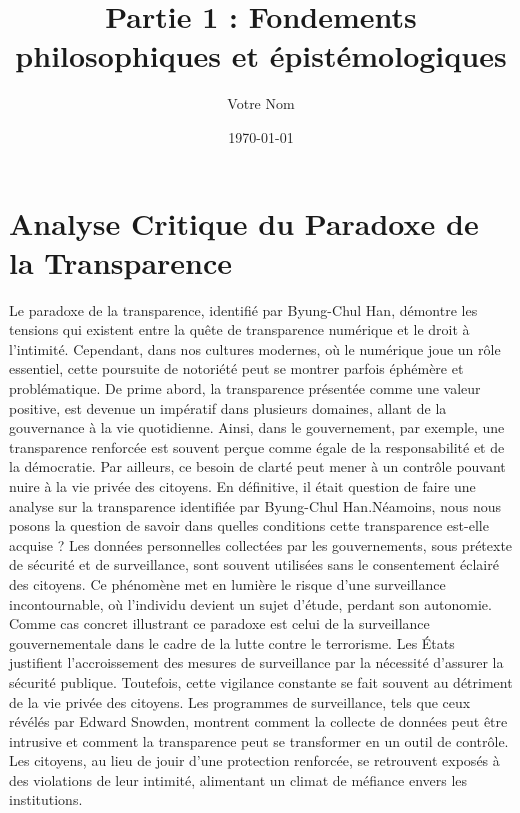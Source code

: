 \documentclass[12pt,a4paper]{article}
\title{Partie 1 : Fondements philosophiques et épistémologiques}
\author{Votre Nom} %
\date{\today}
\begin{document}
\maketitle

\section{Analyse Critique du Paradoxe de la Transparence}

Le paradoxe de la transparence, identifié par Byung-Chul Han, démontre les tensions qui existent entre la quête de transparence numérique et le droit à l'intimité. Cependant, dans nos cultures modernes, où le numérique joue un rôle essentiel, cette poursuite de notoriété peut se montrer parfois éphémère et problématique.
De prime abord, la transparence présentée comme une valeur positive, est devenue un impératif dans plusieurs domaines, allant de la gouvernance à la vie quotidienne. Ainsi, dans le gouvernement, par exemple, une transparence renforcée est souvent perçue comme égale de la responsabilité et de la démocratie. Par ailleurs, ce besoin de clarté peut mener à un contrôle pouvant nuire à la vie privée des citoyens. 
En définitive, il était question de faire une analyse sur la transparence identifiée par Byung-Chul Han.Néamoins, nous nous posons la question de savoir dans quelles conditions cette transparence est-elle acquise ? Les données personnelles collectées par les gouvernements, sous prétexte de sécurité et de surveillance, sont souvent utilisées sans le consentement éclairé des citoyens. Ce phénomène met en lumière le risque d'une surveillance incontournable, où l'individu devient un sujet d’étude, perdant son autonomie.
	Comme cas concret illustrant ce paradoxe est celui de la surveillance gouvernementale dans le cadre de la lutte contre le terrorisme. Les États justifient l'accroissement des mesures de surveillance par la nécessité d'assurer la sécurité publique. Toutefois, cette vigilance constante se fait souvent au détriment de la vie privée des citoyens. Les programmes de surveillance, tels que ceux révélés par Edward Snowden, montrent comment la collecte de données peut être intrusive et comment la transparence peut se transformer en un outil de contrôle. Les citoyens, au lieu de jouir d'une protection renforcée, se retrouvent exposés à des violations de leur intimité, alimentant un climat de méfiance envers les institutions.
\end{document}
